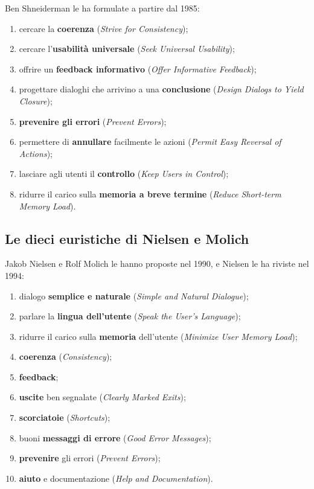 Ben Shneiderman le ha formulate a partire dal 1985:

\begin{enumerate}
  \item cercare la \textbf{coerenza} (\textit{Strive for Consistency});
  \item cercare l'\textbf{usabilità universale} (\textit{Seek Universal Usability});
  \item offrire un \textbf{feedback informativo} (\textit{Offer Informative Feedback});
  \item progettare dialoghi che arrivino a una \textbf{conclusione} (\textit{Design Dialogs to Yield Closure});
  \item \textbf{prevenire gli errori} (\textit{Prevent Errors});
  \item permettere di \textbf{annullare} facilmente le azioni (\textit{Permit Easy Reversal of Actions});
  \item lasciare agli utenti il \textbf{controllo} (\textit{Keep Users in Control});
  \item ridurre il carico sulla \textbf{memoria a breve termine} (\textit{Reduce Short-term Memory Load}).
\end{enumerate}

\subsection{Le dieci euristiche di Nielsen e Molich}

Jakob Nielsen e Rolf Molich le hanno proposte nel 1990, e Nielsen le ha riviste nel 1994:

\begin{enumerate}
  \item dialogo \textbf{semplice e naturale} (\textit{Simple and Natural Dialogue});
  \item parlare la \textbf{lingua dell'utente} (\textit{Speak the User's Language});
  \item ridurre il carico sulla \textbf{memoria} dell'utente (\textit{Minimize User Memory Load});
  \item \textbf{coerenza} (\textit{Consistency});
  \item \textbf{feedback};
  \item \textbf{uscite} ben segnalate (\textit{Clearly Marked Exits});
  \item \textbf{scorciatoie} (\textit{Shortcuts});
  \item buoni \textbf{messaggi di errore} (\textit{Good Error Messages});
  \item \textbf{prevenire} gli errori (\textit{Prevent Errors});
  \item \textbf{aiuto} e documentazione (\textit{Help and Documentation}).
\end{enumerate}

